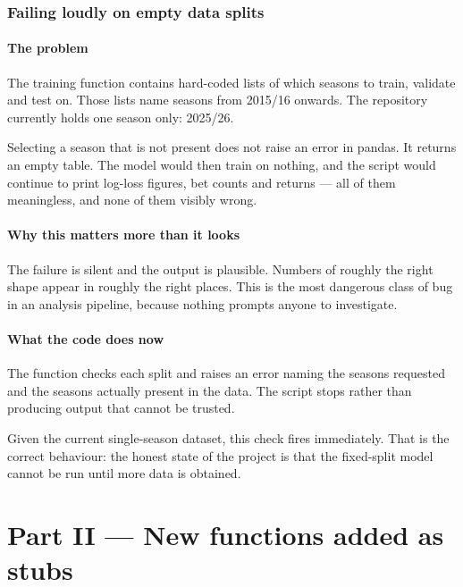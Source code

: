 \documentclass[11pt,a4paper]{article}
\begin{document}
\section{Failing loudly on empty data splits}

\subsection{The problem}

The training function contains hard-coded lists of which seasons to train,
validate and test on. Those lists name seasons from 2015/16 onwards. The
repository currently holds one season only: 2025/26.

Selecting a season that is not present does not raise an error in pandas. It
returns an empty table. The model would then train on nothing, and the script
would continue to print log-loss figures, bet counts and returns --- all of
them meaningless, and none of them visibly wrong.

\subsection{Why this matters more than it looks}

The failure is silent and the output is plausible. Numbers of roughly the
right shape appear in roughly the right places. This is the most dangerous
class of bug in an analysis pipeline, because nothing prompts anyone to
investigate.

\subsection{What the code does now}

The function checks each split and raises an error naming the seasons
requested and the seasons actually present in the data. The script stops
rather than producing output that cannot be trusted.

Given the current single-season dataset, this check fires immediately. That is
the correct behaviour: the honest state of the project is that the fixed-split
model cannot be run until more data is obtained.

\part*{Part II --- New functions added as stubs}
\end{document}
